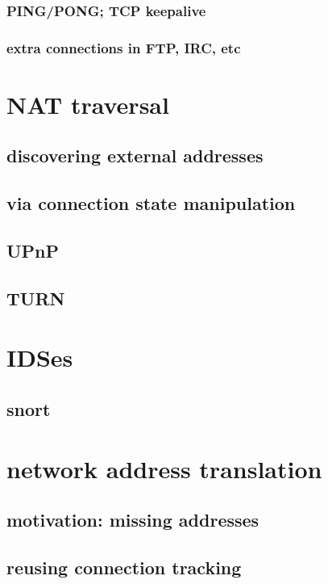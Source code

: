 \subsubsection{PING/PONG; TCP keepalive}

\subsubsection{extra connections in FTP, IRC, etc}

\section{NAT traversal}

\subsection{discovering external addresses}

\subsection{via connection state manipulation}

\subsection{UPnP}

\subsection{TURN}

\section{IDSes}

\subsection{snort}

\section{network address translation}

\subsection{motivation: missing addresses}

\subsection{reusing connection tracking}
